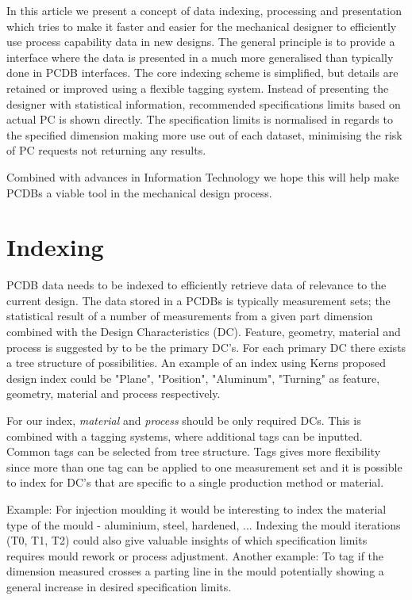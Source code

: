 \documentclass[aip,amsmath, reprint, author-year]{revtex4-1}
\begin{document}
In this article we present a concept of data indexing, processing and presentation which tries to make it faster and easier for the mechanical designer to efficiently use process capability data in new designs. 
The general principle is to provide a interface where the data is presented in a much more generalised than typically done in PCDB interfaces. 
The core indexing scheme is simplified, but details are retained or improved using a flexible tagging system. 
Instead of presenting the designer with statistical information, recommended specifications limits based on actual PC is shown directly. 
The specification limits is normalised in regards to the specified dimension making more use out of each dataset, minimising the risk of PC requests not returning any results. 

Combined with advances in Information Technology we hope this will help make PCDBs a viable tool in the mechanical design process. 

\section{Indexing}
PCDB data needs to be indexed to efficiently retrieve data of relevance to the current design. The data stored in a PCDBs is typically measurement sets; the statistical result of a number of measurements from a given part dimension combined with the Design Characteristics (DC). Feature, geometry, material and process is suggested by \cite{kern2003forecasting} to be the primary DC's. For each primary DC there exists a tree structure of possibilities. An example of an index using Kerns proposed design index could be "Plane", "Position", "Aluminum", "Turning" as feature, geometry, material and process respectively. 

For our index,  \emph{material} and \emph{process} should be only required DCs. This is combined with a tagging systems, where additional tags can be inputted. Common tags can be selected from tree structure. 
Tags gives more flexibility since more than one tag can be applied to one measurement set and it is possible to index for DC's that are specific to a single production method or material. 

Example: For injection moulding it would be interesting to index the material type of the mould - aluminium, steel, hardened, ... Indexing the mould iterations (T0, T1, T2) could also give valuable insights of which specification limits requires mould rework or process adjustment. Another example: To tag if the dimension measured crosses a parting line in the mould potentially showing a general increase in desired specification limits.
\end{document}
